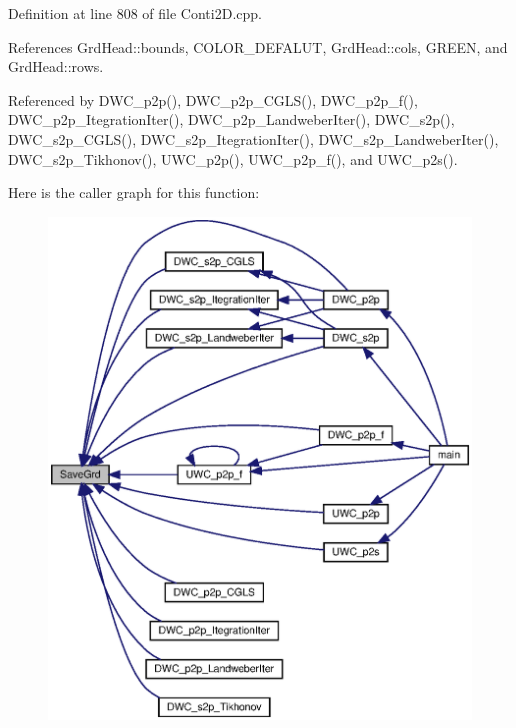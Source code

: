 Definition at line 808 of file Conti2\+D.\+cpp.



References Grd\+Head\+::bounds, C\+O\+L\+O\+R\+\_\+\+D\+E\+F\+A\+L\+UT, Grd\+Head\+::cols, G\+R\+E\+EN, and Grd\+Head\+::rows.



Referenced by D\+W\+C\+\_\+p2p(), D\+W\+C\+\_\+p2p\+\_\+\+C\+G\+L\+S(), D\+W\+C\+\_\+p2p\+\_\+f(), D\+W\+C\+\_\+p2p\+\_\+\+Itegration\+Iter(), D\+W\+C\+\_\+p2p\+\_\+\+Landweber\+Iter(), D\+W\+C\+\_\+s2p(), D\+W\+C\+\_\+s2p\+\_\+\+C\+G\+L\+S(), D\+W\+C\+\_\+s2p\+\_\+\+Itegration\+Iter(), D\+W\+C\+\_\+s2p\+\_\+\+Landweber\+Iter(), D\+W\+C\+\_\+s2p\+\_\+\+Tikhonov(), U\+W\+C\+\_\+p2p(), U\+W\+C\+\_\+p2p\+\_\+f(), and U\+W\+C\+\_\+p2s().

Here is the caller graph for this function\+:\nopagebreak
\begin{figure}[H]
\begin{center}
\leavevmode
\includegraphics[width=350pt]{Conti2D_8h_a69964a1746c72c7a75836f4d2d544108_a69964a1746c72c7a75836f4d2d544108_icgraph}
\end{center}
\end{figure}
\mbox{\label{Conti2D_8h_ab2ce25b899be8dca564dd7dccde5e671_ab2ce25b899be8dca564dd7dccde5e671}} 

